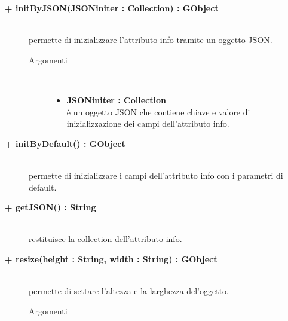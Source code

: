 \begin{description}
\begin{description}
\end{description}

\begin{description}
		\item[\textbf{+ initByJSON(JSONiniter : Collection) : GObject			}] \hfill \\
			permette di inizializzare l'attributo info tramite un oggetto JSON. 
			
		\begin{description}
			\item[Argomenti] \hfill \\
				\begin{itemize}
				
					\item \textbf{JSONiniter : Collection			} \hfill \\
					è un oggetto JSON che contiene chiave e valore di inizializzazione dei campi dell'attributo info. 
				\end{itemize}
		\end{description}

\end{description}

\begin{description}
		\item[\textbf{+ initByDefault() : GObject			}] \hfill \\
			permette di inizializzare i campi dell'attributo info con i parametri di default. 

\end{description}

\begin{description}
		\item[\textbf{+ getJSON() : String			}] \hfill \\
			restituisce la collection dell'attributo info.

\end{description}

\begin{description}
		\item[\textbf{+ resize(height : String, width : String) : GObject			}] \hfill \\
			permette di settare l'altezza e la larghezza del'oggetto.
			
		\begin{description}
			\item[Argomenti] \hfill \\
				\begin{itemize}
				

\end{itemize}
\end{description}
\end{description}
\end{description}
